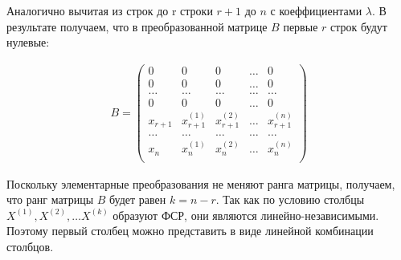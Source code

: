 \begin{answer}
  Аналогично вычитая из строк до r строки $r+1$ до $n$ с коеффициентами  $\lambda$.
  В результате получаем, что в преобразованной матрице $B$ первые  $r$ строк будут нулевые:
  
  \begin{gather*}
    B =
    \begin{pmatrix}
      0 & 0 & 0 & \ldots & 0 \\
      0 & 0 & 0 & \ldots & 0 \\
      \ldots & \ldots & \ldots & \ldots & \ldots \\
      0 & 0 & 0 & \ldots & 0 \\
      x_{r+1} & x_{r+1}^{(1)} & x_{r+1}^{(2)} & \ldots & x_{r+1}^{(n)} \\
      \ldots & \ldots & \ldots & \ldots & \ldots \\
      x_n & x_n^{(1)} & x_n^{(2)} & \ldots & x_n^{(n)} \\
    \end{pmatrix}
  \end{gather*} 

  Поскольку элементарные преобразования не меняют ранга матрицы, получаем, что ранг матрицы $B$ будет равен $k = n - r$.
  Так как по условию столбцы $X^{(1)}, X^{(2)}, \ldots X^{(k)}$ образуют ФСР, они являются линейно-независимыми. Поэтому первый столбец можно представить в виде линейной комбинации столбцов.
\end{answer} 


